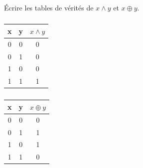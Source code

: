 \documentclass[svgnames,11pt]{beamer}
\begin{document}
\begin{frame}
    \frametitle{}

    \begin{activite}
        Écrire les tables de vérités de $x\land y$ et $x\oplus y$.
    \end{activite}

\end{frame}
\begin{frame}
    \frametitle{}

    \begin{center}
        \begin{tabular}{|c|c|c|}
            \hline
            x & y & $x\land y$ \\
            \hline
            0 & 0 & 0          \\
            \hline
            0 & 1 & 0          \\
            \hline
            1 & 0 & 0          \\
            \hline
            1 & 1 & 1          \\
            \hline
        \end{tabular}
    \end{center}

\end{frame}
\begin{frame}
    \frametitle{}

    \begin{center}
        \begin{tabular}{|c|c|c|}
            \hline
            x & y & $x\oplus y$ \\
            \hline
            0 & 0 & 0           \\
            \hline
            0 & 1 & 1           \\
            \hline
            1 & 0 & 1           \\
            \hline
            1 & 1 & 0           \\
            \hline
        \end{tabular}
    \end{center}

\end{frame}
\end{document}
